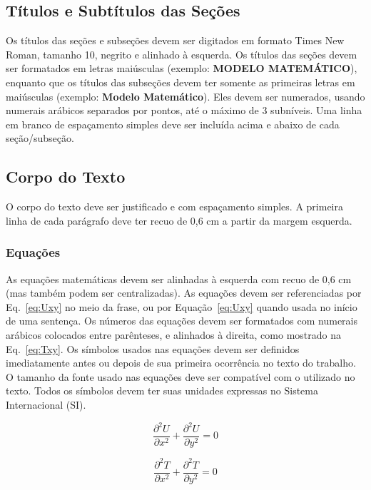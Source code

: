 \documentclass[%
  article,%
  10pt,%
  a4paper,%
  fleqn,%
  oneside,%
  sumario = tradicional,%
  chapter = TITLE,%
  section = TITLE,%
]{abntex2}
\begin{document}
\subsection{Títulos e Subtítulos das Seções}\label{ssec:tit}

Os títulos das seções e subseções devem ser digitados em formato Times New Roman, tamanho 10, negrito e alinhado à esquerda. Os títulos das seções devem ser formatados em letras maiúsculas (exemplo: \textbf{MODELO MATEMÁTICO}), enquanto que os títulos das subseções devem ter somente as primeiras letras em maiúsculas (exemplo: \textbf{Modelo Matemático}). Eles devem ser numerados, usando numerais arábicos separados por pontos, até o máximo de 3 subníveis. Uma linha em branco de espaçamento simples deve ser incluída acima e abaixo de cada seção/subseção.

\subsection{Corpo do Texto}\label{ssec:corpo}

O corpo do texto deve ser justificado e com espaçamento simples. A primeira linha de cada parágrafo deve ter recuo de 0,6 cm a partir da margem esquerda.

\subsubsection{Equações}\label{sssec:eqs}

As equações matemáticas devem ser alinhadas à esquerda com recuo de 0,6 cm (mas também podem ser centralizadas). As equações devem ser referenciadas por Eq.~\eqref{eq:Uxy} no meio da frase, ou por Equação~\eqref{eq:Uxy} quando usada no início de uma sentença. Os números das equações devem ser formatados com numerais arábicos colocados entre parênteses, e alinhados à direita, como mostrado na Eq.~\eqref{eq:Txy}. Os símbolos usados nas equações devem ser definidos imediatamente antes ou depois de sua primeira ocorrência no texto do trabalho. O tamanho da fonte usado nas equações deve ser compatível com o utilizado no texto. Todos os símbolos devem ter suas unidades expressas no Sistema Internacional (SI).

\begin{equation}\label{eq:Uxy}
\frac{\partial^2 U}{\partial x^2} + \frac{\partial^2 U}{\partial y^2} = 0
\end{equation}

\begin{equation}\label{eq:Txy}
\frac{\partial^2 T}{\partial x^2} + \frac{\partial^2 T}{\partial y^2} = 0
\end{equation}
\end{document}
